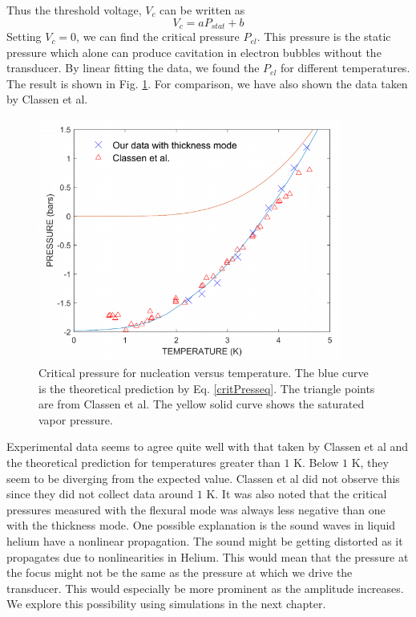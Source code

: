 Thus the threshold voltage, $V_c$ can be written as
\begin{equation}\label{threshVoltageEq}
V_c=aP_{stat}+b
\end{equation}
Setting $V_c=0$, we can find the critical pressure $P_{el}$. This pressure is the static pressure which alone can produce cavitation in electron bubbles without the transducer. By linear fitting the data, we found the $P_{el}$ for different temperatures. The result is shown in Fig. \ref{non_linear2}. For comparison, we have also shown the data taken by Classen et al. \cite{Classen}
\begin{figure}[H]
\centering 
\includegraphics[width=100mm, height=80mm]{Nucleation_Experiment/non_linear2.png}
\caption{Critical pressure for nucleation versus temperature. The blue curve is the theoretical prediction by Eq. \ref{critPresseq}. The triangle points are from Classen et al. \cite{Classen} The yellow solid curve shows the saturated vapor pressure. \cite{Classen} \cite{Yang2018thesis}}
\label{non_linear2}
\end{figure}

Experimental data seems to agree quite well with that taken by Classen et al \cite{Classen} and the theoretical prediction for temperatures greater than $1$ K. Below $1$ K, they seem to be diverging from the expected value. Classen et al \cite{Classen} did not observe this since they did not collect data around $1$ K. It was also noted that the critical pressures measured with the flexural mode was always less negative than one with the thickness mode. One possible explanation is the sound waves in liquid helium have a nonlinear propagation. The sound might be getting distorted as it propagates due to nonlinearities in Helium. This would mean that the pressure at the focus might not be the same as the pressure at which we drive the transducer. This would especially be more prominent as the amplitude increases. We explore this possibility using simulations in the next chapter.